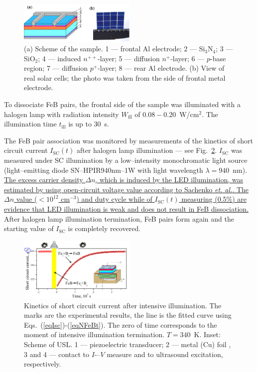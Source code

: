 \documentclass[%
 aip,jap,
 amsmath,amssymb,
 reprint,%
]{revtex4-1}
\begin{document}
\begin{figure}
\includegraphics[width=0.5\textwidth]{Fig1}%
\caption{\label{Fig:sample}
(a) Scheme of the sample.
1 –-- frontal Al electrode;
2 –-- Si$_3$N$_4$;
3 –-- SiO$_2$;
4 –-- induced $n^{++}$-layer;
5 –-- diffusion $n^+$-layer;
6 –-- $p$-base region;
7 –-- diffusion $p^+$-layer;
8 –-- rear Al electrode.
(b) View of real solar cells;
the photo was taken from the side of frontal metal electrode.
}
\end{figure}

To dissociate FeB pairs, the frontal side of the sample was illuminated with a halogen lamp with radiation intensity $W_\mathrm{ill}$ of $0.08-0.20$~W/cm$^2$.
The illumination time $t_\mathrm{ill}$ is up to 30~s.

The FeB pair association was monitored by measurements of the kinetics of
short circuit current $I_\mathrm{SC}(t)$ after halogen lamp illumination –-- see Fig.~\ref{Fig:Method}.
$I_\mathrm{SC}$ was measured under SC illumination by a low--intensity monochromatic light source (light--emitting diode SN--HPIR940nm--1W with light wavelength $\lambda=940$~nm).
\textcolor[rgb]{0.00,0.07,1.00}{\uline{
The excess carrier density $\Delta n$, which is induced by the LED illumination,
was estimated by using open-circuit voltage value according to Sachenko \emph{et. al.}\cite{JAPSach}.
The $\Delta n$ value ($<10^{12}$ cm$^{-3}$) and duty cycle while of $I_\mathrm{SC}(t)$ measuring (0.5\%)
are evidence that LED illumination is weak and does not result in FeB dissociation.}}
After halogen lamp illumination termination,
FeB pairs form again and the starting value of $I_\mathrm{SC}$ is completely recovered.


\begin{figure}
\includegraphics[width=0.5\textwidth]{Fig2}%
\caption{\label{Fig:Method}
Kinetics of short circuit current after intensive illumination.
The marks are the experimental results,
the line is the fitted curve using Eqs.~(\ref{eqIsc})-(\ref{eqNFeBt}).
The zero of time corresponds to the moment of intensive illumination termination.
$T=340$~K.
Inset: Scheme of USL.
1 –-- piezoelectric transducer;
2 –-- metal (Cu) foil ,
3 and 4 --- contact to $I$-–$V$ measure and to ultrasound excitation, respectively.
}
\end{figure}
\end{document}
